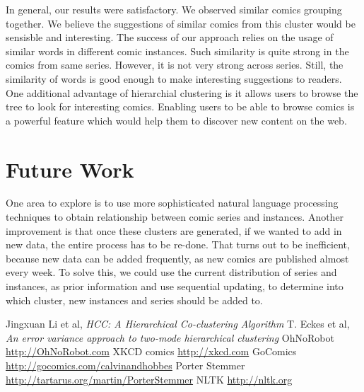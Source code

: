 \documentclass[11pt]{article}
\begin{document}
In general, our results were satisfactory. We observed similar comics grouping together. We believe the suggestions of similar comics from this cluster would be sensisble and interesting. The success of our approach relies on the usage of similar words in different comic instances. Such similarity is quite strong in the comics from same series. However, it is not very strong across series. Still, the similarity of words is good enough to make interesting suggestions to readers. One additional advantage of hierarchial clustering is it allows users to browse the tree to look for interesting comics. Enabling users to be able to browse comics is a powerful feature which would help them to discover new content on the web.

\section{Future Work}
One area to explore is to use more sophisticated natural language processing techniques to obtain relationship between comic series and instances. Another improvement is that once these clusters are generated, if we wanted to add in new data, the entire process has to be re-done. That turns out to be inefficient, because new data can be added frequently, as new comics are published almost every week. To solve this, we could use the current distribution of series and instances, as prior information and use sequential updating,  to determine into which cluster, new instances and series should be added to.

\begin{thebibliography}{9}
 Jingxuan Li et al, \emph{HCC: A Hierarchical Co-clustering Algorithm}
 T. Eckes et al, \emph{An error variance approach to
    two-mode hierarchical clustering}
 OhNoRobot \url{http://OhNoRobot.com}
 XKCD comics \url{http://xkcd.com}
 GoComics \url{http://gocomics.com/calvinandhobbes}
 Porter Stemmer \url{http://tartarus.org/martin/PorterStemmer}
 NLTK \url{http://nltk.org}
\end{thebibliography}
\end{document}
